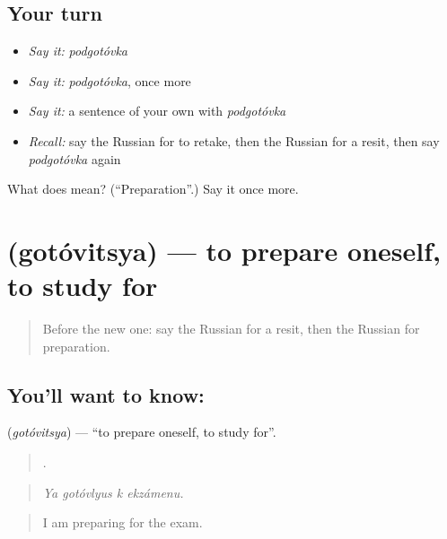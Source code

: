\subsection*{Your turn}
\begin{itemize}
\raggedright
  \item \emph{Say it:} \emph{podgotóvka}
  \item \emph{Say it:} \emph{podgotóvka}, once more
  \item \emph{Say it:} a sentence of your own with \emph{podgotóvka}
  \item \emph{Recall:} say the Russian for to retake, then the Russian for a resit, then say \emph{podgotóvka} again
\end{itemize}

\begin{tcolorbox}[breakable,colback=teal!4,colframe=teal!35!black,title={Before you move on}]
What does  mean? (\textquotedblleft{}Preparation\textquotedblright{}.) Say it once more.
\end{tcolorbox}
\section[\texorpdfstring{\ru{готовиться} (gotóvitsya)}{готовиться (gotóvitsya)}]{ (gotóvitsya) — to prepare oneself, to study for}

\label{lesson:RU-C382-gotovitsya}



\begin{quote}
Before the new one: say the Russian for a resit, then the Russian for preparation.
\end{quote}

\subsection*{You'll want to know: }
\textbf{} (\emph{gotóvitsya}) — \textquotedblleft{}to prepare oneself, to study for\textquotedblright{}.

\begin{quote}
   .
\end{quote}

\begin{quote}
\emph{Ya gotóvlyus k ekzámenu.}
\end{quote}

\begin{quote}
I am preparing for the exam.
\end{quote}

